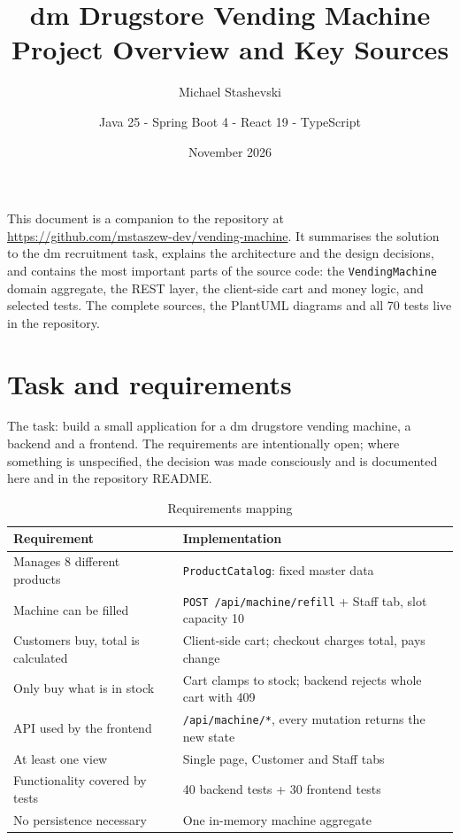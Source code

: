 \documentclass[11pt,a4paper]{article}
\title{\color{dmblue}\Huge dm Drugstore Vending Machine\\[6pt]
\color{black}\Large Project Overview and Key Sources}
\author{Michael Stashevski \and Java 25 - Spring Boot 4 - React 19 - TypeScript}
\date{November 2026}
\newcommand{\code}[1]{\texttt{\small #1}}
\begin{document}
\maketitle
\thispagestyle{empty}

\vspace{4mm}
\begin{center}
\begin{minipage}{0.9\textwidth}
\small
This document is a companion to the repository at
\url{https://github.com/mstaszew-dev/vending-machine}. It summarises the
solution to the dm recruitment task, explains the architecture and the design
decisions, and contains the most important parts of the source code: the
\code{VendingMachine} domain aggregate, the REST layer, the client-side cart
and money logic, and selected tests. The complete sources, the PlantUML
diagrams and all 70 tests live in the repository.
\end{minipage}
\end{center}

\newpage
\tableofcontents
\newpage

\section{Task and requirements}

The task: build a small application for a dm drugstore vending machine, a
backend and a frontend. The requirements are intentionally open; where
something is unspecified, the decision was made consciously and is documented
here and in the repository README.

\begin{table}[h]
\centering
\small
\begin{tabular}{@{}ll@{}}
\toprule
\textbf{Requirement} & \textbf{Implementation} \\
\midrule
Manages 8 different products & \code{ProductCatalog}: fixed master data \\
Machine can be filled & \code{POST /api/machine/refill} + Staff tab, slot capacity 10 \\
Customers buy, total is calculated & Client-side cart; checkout charges total, pays change \\
Only buy what is in stock & Cart clamps to stock; backend rejects whole cart with 409 \\
API used by the frontend & \code{/api/machine/*}, every mutation returns the new state \\
At least one view & Single page, Customer and Staff tabs \\
Functionality covered by tests & 40 backend tests + 30 frontend tests \\
No persistence necessary & One in-memory machine aggregate \\
\bottomrule
\end{tabular}
\caption{Requirements mapping}
\end{table}
\end{document}
